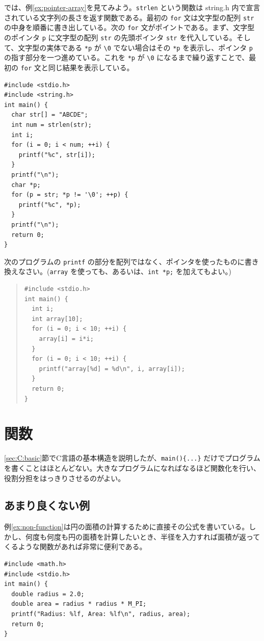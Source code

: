 では、例\ref{ex:pointer-array}を見てみよう。\verb|strlen| という関数は string.h 内で宣言されている文字列の長さを返す関数である。最初の \verb|for| 文は文字型の配列 \verb|str| の中身を順番に書き出している。次の \verb|for| 文がポイントである。まず、文字型のポインタ \verb|p| に文字型の配列 \verb|str| の先頭ポインタ \verb|str| を代入している。そして、文字型の実体である \verb|*p| が \verb|\0| でない場合はその \verb|*p| を表示し、ポインタ \verb|p| の指す部分を一つ進めている。これを \verb|*p| が \verb|\0| になるまで繰り返すことで、最初の \verb|for| 文と同じ結果を表示している。
\begin{reidai}\label{ex:pointer-array}
\begin{verbatim}
#include <stdio.h>
#include <string.h>
int main() {
  char str[] = "ABCDE";
  int num = strlen(str);
  int i;
  for (i = 0; i < num; ++i) {
    printf("%c", str[i]);
  }
  printf("\n");
  char *p;
  for (p = str; *p != '\0'; ++p) {
    printf("%c", *p);
  }
  printf("\n");
  return 0;
}
\end{verbatim}
\end{reidai}

\begin{renshuu}\label{prob:5-1}
次のプログラムの \verb|printf| の部分を配列ではなく、ポインタを使ったものに書き換えなさい。(\verb|array| を使っても、あるいは、\verb|int *p;| を加えてもよい。)

\begin{quote}
\begin{verbatim}
#include <stdio.h>
int main() {
  int i;
  int array[10];
  for (i = 0; i < 10; ++i) {
    array[i] = i*i;
  }
  for (i = 0; i < 10; ++i) {
    printf("array[%d] = %d\n", i, array[i]);
  }
  return 0;
}
\end{verbatim}
\end{quote}
\end{renshuu}

\section{関数}
\label{sec:C:function}

\ref{sec:C:basic}節でC言語の基本構造を説明したが、\verb|main(){...}| だけでプログラムを書くことはほとんどない。大きなプログラムになればなるほど関数化を行い、役割分担をはっきりさせるのがよい。

\subsection{あまり良くない例}
例\ref{ex:non-function}は円の面積の計算するために直接その公式を書いている。しかし、何度も何度も円の面積を計算したいとき、半径を入力すれば面積が返ってくるような関数があれば非常に便利である。
\begin{reidai}\label{ex:non-function}
\begin{verbatim}
#include <math.h>
#include <stdio.h>
int main() {
  double radius = 2.0;
  double area = radius * radius * M_PI;
  printf("Radius: %lf, Area: %lf\n", radius, area);
  return 0;
}
\end{verbatim}
\end{reidai}

